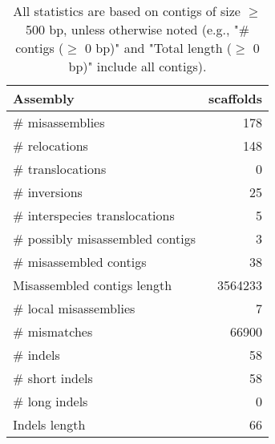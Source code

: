 \documentclass[12pt,a4paper]{article}
\begin{document}
\begin{table}[ht]
\begin{center}
\caption{All statistics are based on contigs of size $\geq$ 500 bp, unless otherwise noted (e.g., "\# contigs ($\geq$ 0 bp)" and "Total length ($\geq$ 0 bp)" include all contigs).}
\begin{tabular}{|l*{1}{|r}|}
\hline
Assembly & scaffolds \\ \hline
\# misassemblies & 178 \\ \hline
\hspace{5mm}\# relocations & 148 \\ \hline
\hspace{5mm}\# translocations & 0 \\ \hline
\hspace{5mm}\# inversions & 25 \\ \hline
\hspace{5mm}\# interspecies translocations & 5 \\ \hline
\# possibly misassembled contigs & 3 \\ \hline
\# misassembled contigs & 38 \\ \hline
Misassembled contigs length & 3564233 \\ \hline
\# local misassemblies & 7 \\ \hline
\# mismatches & 66900 \\ \hline
\# indels & 58 \\ \hline
\hspace{5mm}\# short indels & 58 \\ \hline
\hspace{5mm}\# long indels & 0 \\ \hline
Indels length & 66 \\ \hline
\end{tabular}
\end{center}
\end{table}
\end{document}
